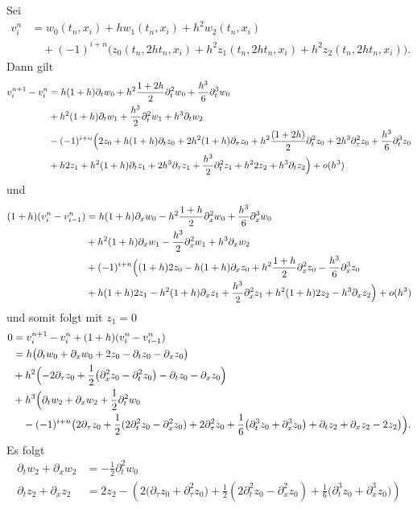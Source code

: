 Sei
\begin{align}
v^n_i &= w_0(t_n, x_i) + h w_1(t_n, x_i) + h^2 w_2(t_n, x_i)\\
&\quad + (-1)^{i+n} \bigl( z_0(t_n, 2 h t_n, x_i) + h^2 z_1(t_n, 2 h t_n, x_i) + h^2 z_2(t_n, 2 h t_n, x_i) \bigr).
\end{align}
Dann gilt
\begin{align*}
v^{n+1}_i - v^n_i &= h (1 + h) \partial_t w_0 + h^2 \frac{1 + 2h}{2} \partial^2_t w_0 +  \frac{h^3}{6} \partial^3_t w_0\\
&+ h^2 (1 + h) \partial_t w_1 + \frac{h^3}{2} \partial^2_t w_1 + h^3 \partial_t w_2\\
&- (-1)^{i+n} \Bigl( 2z_0 + h (1 + h) \partial_t z_0  + 2 h^2 (1 + h) \partial_\tau z_0 + h^2 \frac{(1 + 2h)}{2} \partial^2_t z_0 + 2 h^3 \partial^2_\tau z_0 + \frac{h^3}{6} \partial^3_t z_0\\
&+  h 2z_1 + h^2 (1 + h) \partial_t z_1  + 2 h^3 \partial_\tau z_1 + \frac{h^3}{2} \partial^2_t z_1 + h^2 2 z_2 + h^3 \partial_t z_2 \Bigr) + o(h^3)
\end{align*}
und
\begin{align*}
(1 + h) (v^n_i - v^n_{i-1}) &= h (1 + h) \partial_x w_0 - h^2 \frac{1 + h}{2} \partial^2_x w_0 + \frac{h^3}{6} \partial^3_x w_0\\
&+ h^2 (1 + h) \partial_x w_1 - \frac{h^3}{2} \partial^2_x w_1 + h^3 \partial_x w_2\\
&+ (-1)^{i+n} \Bigl( (1+h)2z_0 - h(1+h) \partial_x z_0 + h^2 \frac{1+h}{2} \partial^2_x z_0 - \frac{h^3}{6} \partial^3_x z_0\\
&+ h(1+h) 2z_1 - h^2 (1 + h) \partial_x z_1 + \frac{h^3}{2} \partial^2_x z_1 + h^2 (1 + h) 2 z_2 - h^3 \partial_x z_2 \Bigr) + o(h^3)
\end{align*}
und somit folgt mit $z_1 = 0$
\begin{align*}
0 &= v^{n+1}_i - v^n_i + (1 + h) (v^n_i - v^n_{i-1})\\
&= h \bigl( \partial_t w_0 + \partial_x w_0  + 2 z_0 - \partial_t z_0 - \partial_x z_0 \bigr)\\
&+ h^2 \Bigl( - 2 \partial_\tau z_0 + \frac{1}{2} \bigl( \partial^2_x z_0 - \partial^2_t z_0 \bigr)  - \partial_t z_0 - \partial_x z_0 \Bigr)\\
&+ h^3 \Bigl( \partial_t w_2 + \partial_x w_2 + \frac{1}{2} \partial^2_t w_0\\
&\quad - (-1)^{i+n} \bigl( 2 \partial_\tau z_0 + \frac{1}{2} (2\partial^2_t z_0 - \partial^2_x z_0) + 2 \partial^2_\tau z_0 + \frac{1}{6} \bigl(\partial^3_t z_0 + \partial^3_x z_0\bigr) + \partial_t z_2  + \partial_x z_2  - 2 z_2\bigr) \Bigr).
\end{align*}
Es folgt
\begin{align}
\partial_t w_2 + \partial_x w_2 &= - \frac{1}{2} \partial^2_t w_0\\
\partial_t z_2 + \partial_x z_2 &= 2 z_2 - \left( 2 \bigl( \partial_\tau z_0 + \partial^2_\tau z_0 \bigr) + \frac{1}{2} (2\partial^2_t z_0 - \partial^2_x z_0) + \frac{1}{6} \bigl(\partial^3_t z_0 + \partial^3_x z_0\bigr) \right)
\end{align}
